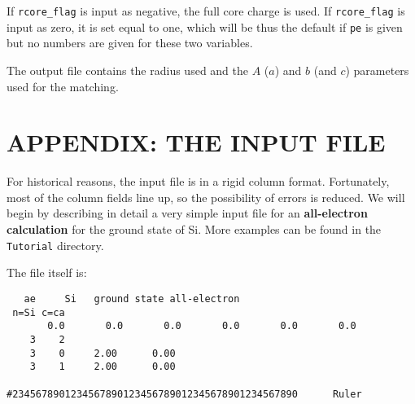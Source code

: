 \documentclass[11pt]{article}
\begin{document}
If {\tt rcore\_flag} is input as negative, the full core charge is used.
If {\tt rcore\_flag} is input as zero, it is set equal to one, which will be
thus the default if {\tt pe} is given but no numbers are given for these
two variables.

The output file contains the radius used and the $A$ ($a$) and $b$ (and $c$)
parameters used for the matching.




\section{APPENDIX: THE INPUT FILE}
\label{sec:inputfile}

For historical reasons, the input file is in a rigid column
format. Fortunately, most of the column fields line up, so the
possibility of errors is reduced.  We will begin by describing in
detail a very simple input file for an {\bf all-electron calculation} for
the ground state of Si. More examples can be found in the {\tt
Tutorial} directory.

The file itself is:
\begin{verbatim}
   ae     Si   ground state all-electron
 n=Si c=ca 
       0.0       0.0       0.0       0.0       0.0       0.0
    3    2
    3    0     2.00      0.00
    3    1     2.00      0.00

#2345678901234567890123456789012345678901234567890      Ruler
\end{verbatim}
\end{document}
